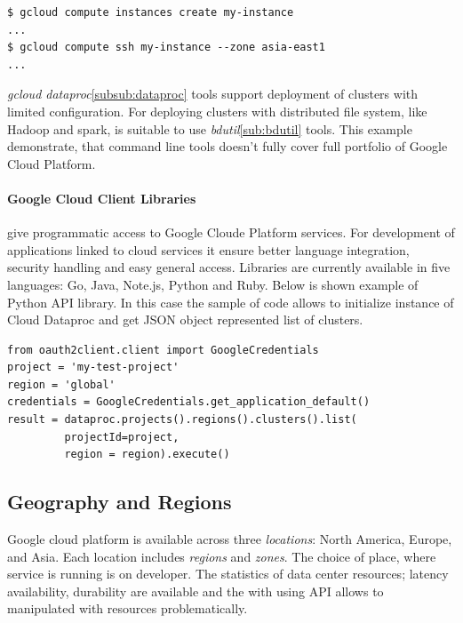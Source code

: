 \documentclass[a4paper,12pt,oneside]{report}
\begin{document}
\begin{footnotesize}\begin{lstlisting}[style=mybash]
$ gcloud compute instances create my-instance
...
$ gcloud compute ssh my-instance --zone asia-east1
...
\end{lstlisting}\end{footnotesize}
 

\textit{gcloud dataproc}\ref{subsub:dataproc} tools support deployment of clusters with limited configuration. For deploying 
clusters with distributed file system, like Hadoop and spark, is suitable to use \textit{bdutil}\ref{sub:bdutil} tools. 
This example demonstrate, that command line tools doesn’t fully cover full portfolio of Google Cloud Platform. 
   
\paragraph{Google Cloud Client Libraries} give programmatic access to Google Cloude Platform services. For development of applications 
linked to cloud services it ensure better language integration, security handling and easy general access. Libraries are currently 
available in five languages: Go, Java, Note.js, Python and Ruby. Below is shown 
example of Python API library. In this case the sample of code allows to initialize  
instance of Cloud Dataproc and get JSON object represented list of clusters.

\begin{footnotesize}\begin{lstlisting}[style=python]
from oauth2client.client import GoogleCredentials
project = 'my-test-project'
region = 'global'
credentials = GoogleCredentials.get_application_default()
result = dataproc.projects().regions().clusters().list(
         projectId=project,
         region = region).execute()
\end{lstlisting}\end{footnotesize}
 


		\subsection{Geography and Regions}
Google cloud platform is available across three \textit{locations}: North America, Europe, and Asia. Each location includes 
\textit{regions} and \textit{zones}. The choice of place, where service is running is on developer. The statistics of data 
center resources; latency availability, durability are available and the with using API allows to manipulated with resources problematically. 
\end{document}
